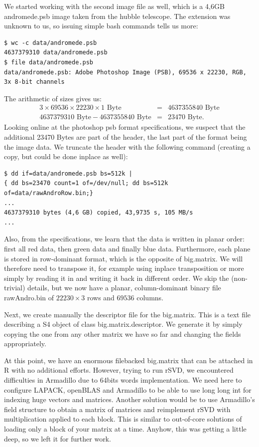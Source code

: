 \documentclass[a4paper,11pt]{amsart}
\begin{document}
We started working with the second image file as well, which is a 4,6GB andromede.psb image taken from the hubble telescope. The extension was unknown to us, so issuing simple bash commands tells us more:
\begin{verbatim}
$ wc -c data/andromede.psb
4637379310 data/andromede.psb
$ file data/andromede.psb
data/andromede.psb: Adobe Photoshop Image (PSB), 69536 x 22230, RGB, 3x 8-bit channels
\end{verbatim}
The arithmetic of sizes gives us:
\begin{eqnarray*}
  3\times 69536\times 22230 \times 1\text{ Byte} &=& 4 637 355 840\text{ Byte}\\
4 637 379 310\text{ Byte} - 4 637 355 840\text{ Byte} &=& 23 470\text{ Byte}.
\end{eqnarray*}
Looking online at the photoshop psb format specifications, we suspect that the additional 23470 Bytes are part of the header, the last part of the format being the image data. We truncate the header with the following command (creating a copy, but could be done inplace as well):
\begin{verbatim}
$ dd if=data/andromede.psb bs=512k |
{ dd bs=23470 count=1 of=/dev/null; dd bs=512k of=data/rawAndroRow.bin;}
...
4637379310 bytes (4,6 GB) copied, 43,9735 s, 105 MB/s
...
\end{verbatim}
Also, from the specifications, we learn that the data is written in planar order: first all red data, then green data and finally blue data. Furthermore, each plane is stored in row-dominant format, which is the opposite of big.matrix. We will therefore need to transpose it, for example using inplace transposition or more simply by reading it in and writing it back in different order. We skip the (non-trivial) details, but we now have a planar, column-dominant binary file rawAndro.bin of $22230\times 3$ rows and $69536$ columns.

Next, we create manually the descriptor file for the big.matrix. This is a text file describing a S4 object of class big.matrix.descriptor. We generate it by simply copying the one from any other matrix we have so far and changing the fields appropriately.

At this point, we have an enormous filebacked big.matrix that can be attached in R with no additional efforts. However, trying to run rSVD, we encountered difficulties in Armadillo due to 64bits words implementation. We need here to configure LAPACK, openBLAS and Armadillo to be able to use long long int for indexing huge vectors and matrices. Another solution would be to use Armadillo's field structure to obtain a matrix of matrices and reimplement rSVD with multiplication applied to each block. This is similar to out-of-core solutions of loading only a block of your matrix at a time. Anyhow, this was getting a little deep, so we left it for further work. 
\end{document}
